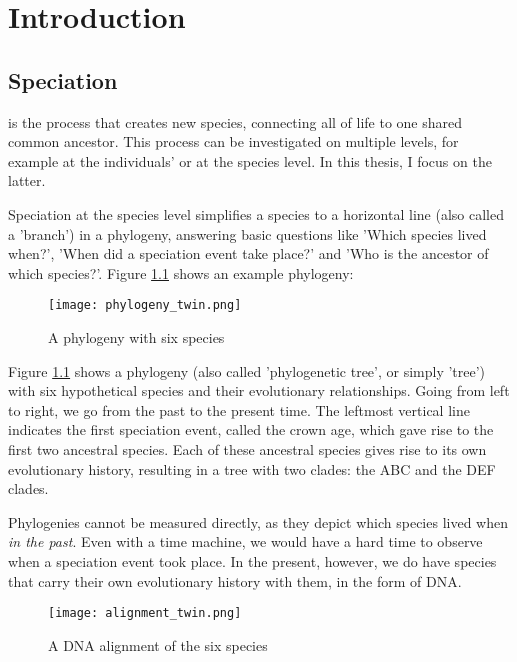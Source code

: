 \chapter{Introduction}
\label{chapter_introduction}

\newpage

\section{Speciation}

\noindent 
{} is the process that creates new species,
connecting all of life to one shared common ancestor. This process
can be investigated on multiple levels, for example at the individuals'
or at the species level. In this thesis, I focus on the latter.

Speciation at the species level simplifies a species to a horizontal 
line (also called a 'branch') in a phylogeny, answering
basic questions like 'Which species lived when?', 'When did a speciation 
event take place?' and 'Who is the ancestor of which species?'. 
Figure \ref{fig:phylogeny} shows an example phylogeny:

\begin{figure}[H]
  \texttt{[image: phylogeny\_twin.png]}
  \caption{
    A phylogeny with six species
  }
  \label{fig:phylogeny}
\end{figure}

Figure \ref{fig:phylogeny} shows a phylogeny (also called 'phylogenetic tree', 
or simply 'tree') with six hypothetical species and their evolutionary 
relationships. Going from left to right, we go from the past to the present 
time. The leftmost vertical line indicates the first speciation event, called
the crown age, which gave rise to the first two ancestral species. Each
of these ancestral species gives rise to its own evolutionary history,
resulting in a tree with two clades: the ABC and the DEF clades.

Phylogenies cannot be measured directly, as they depict which species lived
when \emph{in the past}. Even with a time machine, we would have a hard time
to observe when a speciation event took place. In the present, however, we
do have species that carry their own evolutionary history with them, in the
form of DNA. 

\begin{figure}[H]
  \texttt{[image: alignment\_twin.png]}
  \caption{
    A DNA alignment of the six species
  }
  \label{fig:alignment}
\end{figure}




